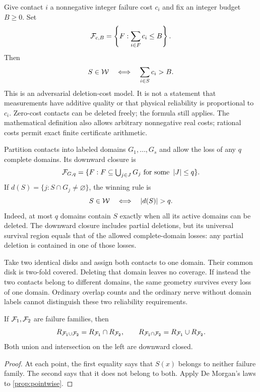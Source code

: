 \begin{example}\label{ex:weighted}
Give contact $i$ a nonnegative integer failure cost $c_i$ and fix an integer budget $B\ge0$. Set
\[
\mathcal F_{c,B}=\left\{F:\sum_{i\in F}c_i\le B\right\}.
\]
Then
\begin{equation}\label{eq:weighted-rule}
S\in\mathcal W\quad\Longleftrightarrow\quad\sum_{i\in S}c_i>B.
\end{equation}
This is an adversarial deletion-cost model. It is not a statement that measurements have additive quality or that physical reliability is proportional to $c_i$. Zero-cost contacts can be deleted freely; the formula still applies. The mathematical definition also allows arbitrary nonnegative real costs; rational costs permit exact finite certificate arithmetic.
\end{example}

\begin{example}\label{ex:domains}
Partition contacts into labeled domains $G_1,\ldots,G_s$ and allow the loss of any $q$ complete domains. Its downward closure is
\[
\mathcal F_{G,q}=\{F:F\subseteq\textstyle\bigcup_{j\in J}G_j\text{ for some }\left|J\right|\le q\}.
\]
If $d(S)=\{j:S\cap G_j\ne\varnothing\}$, the winning rule is
\begin{equation}\label{eq:domain-rule}
S\in\W\quad\Longleftrightarrow\quad\abs{d(S)}>q.
\end{equation}
Indeed, at most $q$ domains contain $S$ exactly when all its active domains can be deleted. The downward closure includes partial deletions, but its universal survival region equals that of the allowed complete-domain losses: any partial deletion is contained in one of those losses.
\end{example}

\begin{example}
Take two identical disks and assign both contacts to one domain. Their common disk is two-fold covered. Deleting that domain leaves no coverage. If instead the two contacts belong to different domains, the same geometry survives every loss of one domain. Ordinary overlap counts and the ordinary nerve without domain labels cannot distinguish these two reliability requirements.
\end{example}

\begin{proposition}\label{prop:combining}
If $\mathcal F_1,\mathcal F_2$ are failure families, then
\[
R_{\mathcal F_1\cup\mathcal F_2}=R_{\mathcal F_1}\cap R_{\mathcal F_2},\qquad
R_{\mathcal F_1\cap\mathcal F_2}=R_{\mathcal F_1}\cup R_{\mathcal F_2}.
\]
Both union and intersection on the left are downward closed.
\end{proposition}
\begin{proof}
At each point, the first equality says that $S(x)$ belongs to neither failure family. The second says that it does not belong to both. Apply De Morgan's laws to \cref{prop:pointwise}.
\end{proof}

